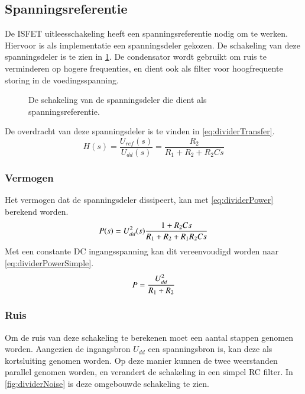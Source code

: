 \subsection{Spanningsreferentie}\label{sec:referenceVoltage}

De ISFET uitleesschakeling heeft een spanningsreferentie nodig om te werken.
Hiervoor is als implementatie een spanningsdeler gekozen. De schakeling van deze spanningsdeler is te zien in \cref{fig:divider}.
De condensator wordt gebruikt om ruis te verminderen op hogere frequenties, en dient ook als filter voor hoogfrequente storing in de voedingsspanning.

\begin{figure}[!htbp]
    \centering
    \def\svgwidth{0.5\textwidth}
    
    \caption{De schakeling van de spanningsdeler die dient als spanningsreferentie.}
    \label{fig:divider}
\end{figure}

De overdracht van deze spanningsdeler is te vinden in \cref{eq:dividerTransfer}.
\begin{equation}\label{eq:dividerTransfer}
    H(s) = \frac{U_{ref}(s)}{U_{dd}(s)} = \frac{R_2}{R_1 + R_2 + R_2Cs}
\end{equation}

\subsubsection{Vermogen}
Het vermogen dat de spanningsdeler dissipeert, kan met \cref{eq:dividerPower} berekend worden.
\begin{equation}\label{eq:dividerPower}
    P(s) = U_{dd}^2(s)\frac{1+R_2Cs}{R_1 + R_2 + R_1R_2Cs}
    \tagaddtext{[\si{\watt}]}
\end{equation}
Met een constante DC ingangsspanning kan dit vereenvoudigd worden naar \cref{eq:dividerPowerSimple}.
\begin{equation}\label{eq:dividerPowerSimple}
    P = \frac{U_{dd}^2}{R_1 + R_2}
    \tagaddtext{[\si{\watt}]}
\end{equation}

\subsubsection{Ruis}
Om de ruis van deze schakeling te berekenen moet een aantal stappen genomen worden. Aangezien de ingangsbron $U_{dd}$ een spanningsbron is, kan deze als kortsluiting genomen worden. Op deze manier kunnen de twee weerstanden parallel genomen worden, en verandert de schakeling in een simpel RC filter. In \cref{fig:dividerNoise} is deze omgebouwde schakeling te zien.

